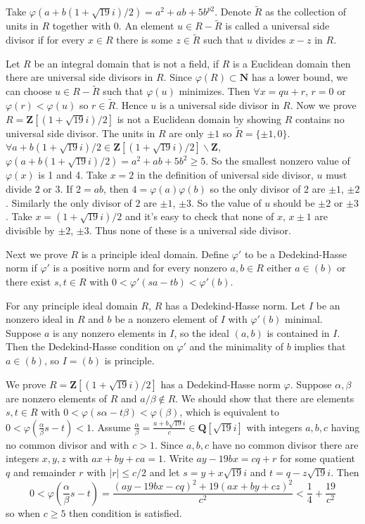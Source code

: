 \begin{answer}
    Take $\varphi(a+b(1+\sqrt{19}i) /2)=a^{2}+ab+5b^{p2}$. Denote $\tilde{R}$ as the collection of units in $R$ together with 0. An element $u\in R-\tilde{R}$ is called a universal side divisor if for every $x\in R$ there is some $z\in \tilde{R}$ such that $u$ divides $x-z$ in $R$.
    
    Let $R$ be an integral domain that is not a field, if $R$ is a Euclidean domain then there are universal side divisors in $R$. Since $\varphi(R)\subset \mathbf{N}$ has a lower bound, we can choose $u\in R-\tilde{R}$ such that $\varphi(u)$ minimizes. Then $\forall x=qu+r$, $r=0$ or $\varphi(r)<\varphi(u)$ so $r\in \tilde{R}$. Hence $u$ is a universal side divisor in $R$. Now we prove $R=\mathbf{Z}[(1+\sqrt{19}i) /2]$ is not a Euclidean domain by showing $R$ contains no universal side divisor. The units in $R$ are only $\pm 1$ so $\tilde{R}=\{\pm 1,0\}$. $\forall a+b(1+\sqrt{19}i) /2\in \mathbf{Z}[(1+\sqrt{19}i) /2]\backslash \mathbf{Z}$, $\varphi(a+b(1+\sqrt{19}i) /2)=a^{2}+ab+5b^{2}\geq 5$. So the smallest nonzero value of $\varphi(x)$ is 1 and 4. Take $x=2$ in the definition of universal side divisor, $u$ must divide $2$ or $3$. If $2=ab$, then $4=\varphi(a)\varphi(b)$ so the only divisor of $2$ are $\pm 1$, $\pm 2$. Similarly the only divisor of $2$ are $\pm 1$, $\pm 3$. So the value of $u$ should be $\pm 2$ or $\pm 3$. Take $x=(1+\sqrt{19}i) /2$ and it's easy to check that none of $x$, $x\pm 1$ are divisible by $\pm 2$, $\pm 3$. Thus none of these is a universal side divisor.

    Next we prove $R$ is a principle ideal domain. Define $\varphi'$ to be a Dedekind-Hasse norm if $\varphi'$ is a positive norm and for every nonzero $a,b\in R$ either $a\in (b)$ or there exist $s,t\in R$ with $0<\varphi'(sa-tb)<\varphi'(b)$. 
    
    For any principle ideal domain $R$, $R$ has a Dedekind-Hasse norm. Let $I$ be an nonzero ideal in $R$ and $b$ be a nonzero element of $I$ with $\varphi'(b)$ minimal. Suppose $a$ is any nonzero elements in $I$, so the ideal $(a,b)$ is contained in $I$. Then the Dedekind-Hasse condition on $\varphi'$ and the minimality of $b$ implies that $a\in (b)$, so $I=(b)$ is principle.

    We prove $R=\mathbf{Z}[(1+\sqrt{19}i) /2]$ has a Dedekind-Hasse norm $\varphi$. Suppose $\alpha, \beta$ are nonzero elements of $R$ and $a /\beta\notin R$. We should show that there are elements $s,t\in R$ with $0<\varphi(s\alpha-t\beta)<\varphi(\beta)$, which is equivalent to $0<\varphi(\frac{\alpha}{\beta}s-t)<1$. Assume $\frac{\alpha}{\beta}=\frac{a+b\sqrt{19}i}{c}\in\mathbf{Q}[\sqrt{19}i]$ with integers $a,b,c$ having no common divisor and with $c>1$. Since $a,b,c$ have no common divisor there are integers $x,y,z$ with $ax+by+ca=1$. Write $ay-19bx=cq+r$ for some quatient $q$ and remainder $r$ with $\left| r  \right|\leq c/2 $ and let $s=y+x\sqrt{19}i$ and $t=q-z\sqrt{19}i$. Then \[0<\varphi(\frac{\alpha}{\beta}s-t)=\frac{(ay-19bx-cq)^{2}+19(ax+by+cz)^{2}}{c^{2}}<\frac{1}{4}+\frac{19}{c^{2}}\] so when $c\geq 5$ then condition is satisfied.
    

\end{answer}

